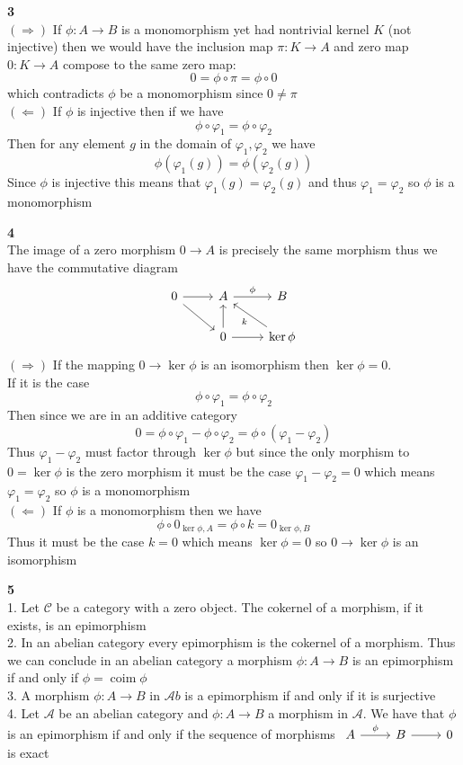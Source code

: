 \documentclass[12pt]{article}
\newenvironment{ques}[1]{\textbf{#1}\vspace{1 mm}\\ }{\bigskip}
\theoremstyle{definition}
\DeclareMathOperator\coim{coim}
\begin{document}
\begin{ques}{3}
	$(\Rightarrow)$ If $\phi:A \to B$ is a monomorphism yet had nontrivial
	kernel $K$ (not injective) then we would have the inclusion map $\pi:K
	\to A$ and zero map $0:K \to A$ compose to the same zero map:
	$$0 = \phi \circ \pi = \phi \circ 0$$
	which contradicts $\phi$ be a monomorphism since $0 \neq \pi$
	\\
	$(\Leftarrow)$ If $\phi$ is injective then if we have
	$$\phi \circ \varphi_1 = \phi \circ \varphi_2$$
	Then for any element $g$ in the domain of $\varphi_1, \varphi_2$ we have
	$$\phi(\varphi_1(g)) = \phi(\varphi_2(g))$$
	Since $\phi$ is injective this means that $\varphi_1(g) = \varphi_2(g)$ and
	thus $\varphi_1 = \varphi_2$ so $\phi$ is a monomorphism
\end{ques}

\begin{ques}{4}
	The image of a zero morphism $0 \to A$ is precisely the same
	morphism thus we have the commutative diagram
	$$\begin{tikzcd}
	0 \arrow[r] \arrow[dr]& A \arrow[r, "\phi"] & B\\
	& 0 \arrow[u] \arrow[r] & \ker \phi \arrow[ul, "k"]
	\end{tikzcd}$$
	$(\Rightarrow)$ If the mapping $0 \to \ker \phi$ is an isomorphism then
	$\ker \phi = 0$.\\
	If it is the case 
	$$\phi \circ \varphi_1 = \phi \circ \varphi_2$$
	Then since we are in an additive category
	$$0 = \phi \circ \varphi_1 - \phi \circ \varphi_2 = \phi \circ (\varphi_1 -
	\varphi_2)$$
	Thus $\varphi_1 - \varphi_2$ must factor through $\ker \phi$ but since the
	only morphism to $0 = \ker \phi$ is the zero morphism it must be the case
	$\varphi_1 - \varphi_2 = 0$ which means $\varphi_1 = \varphi_2$ so $\phi$
	is a monomorphism\\
	$(\Leftarrow)$ If $\phi$ is a monomorphism then we have 
	$$\phi \circ 0_{\ker \phi, A} = \phi \circ k = 0_{\ker \phi, B}$$
	Thus it must be the case $k = 0$ which means $\ker \phi = 0$ so $0 \to \ker
	\phi$ is an isomorphism
\end{ques}

\begin{ques}{5}
	1. Let $\mathscr C$ be a category with a zero object. The
	cokernel of a morphism, if it exists, is an epimorphism\\
	2. In an abelian category every epimorphism is the cokernel of a
	morphism. Thus we can conclude in an abelian category a morphism $\phi: A \to B$
	is an epimorphism if and only if $\phi = \coim \phi$\\
	3. A morphism $\phi: A \to B$ in $\mathcal Ab$ is a epimorphism if and only
	if it is surjective\\
	4. Let $\mathscr A$ be an abelian category and $\phi:A \to B$ a morphism in
	$\mathscr A$. We have that $\phi$ is an epimorphism if and only if the
	sequence of morphisms $\begin{tikzcd} A \arrow[r, "\phi"] & B \arrow[r] & 0
	\end{tikzcd}$ is exact
\end{ques}
\end{document}

